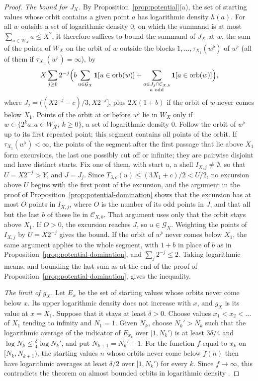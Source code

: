 \documentclass[12pt]{amsart}
\theoremstyle{definition}
\theoremstyle{remark}
\begin{document}
\begin{proof}
\emph{The bound for $J_X$.} By Proposition~\ref{prop:potential}(a), the set of starting values whose orbit contains a given point $a$ has logarithmic density $h(a)$. For all $w$ outside a set of logarithmic density $0$, on which the summand is at most $\sum_{a\in W_X}a\le X^2$, it therefore suffices to bound the summand of $J_X$ at $w$, the sum of the points of $W_X$ on the orbit of $w$ outside the blocks $1,\dots,\tau_{X_1}(w^\flat)$ of $w^\flat$ (all of them if $\tau_{X_1}(w^\flat)=\infty$), by
\[
 X\sum_{j\ge0}2^{-j}\Bigl(b\sum_{u\in\mathcal G_X}\mathbf 1[u\in\operatorname{orb}(w)]+\sum_{\substack{a\in J_j\cap\mathcal C_{X,b}\\ a\text{ odd}}}\mathbf 1[a\in\operatorname{orb}(w)]\Bigr),
\]
where $J_j=((X2^{-j}-c)/3,X2^{-j}]$, plus $2X(1+b)$ if the orbit of $w$ never comes below $X_1$. Points of the orbit at or before $w^\flat$ lie in $W_X$ only if $w\in\{2^ka:a\in W_X,\ k\ge0\}$, a set of logarithmic density $0$. Follow the orbit of $w^\flat$ up to its first repeated point; this segment contains all points of the orbit. If $\tau_{X_1}(w^\flat)<\infty$, the points of the segment after the first passage that lie above $X_1$ form excursions, the last one possibly cut off or infinite; they are pairwise disjoint and have distinct starts. Fix one of them, with start $u$, a shell $I_{X,j}\ne\emptyset$, so that $U=X2^{-j}>Y$, and $J=J_j$. Since $T_{3,c}(u)\le(3X_1+c)/2<U/2$, no excursion above $U$ begins with the first point of the excursion, and the argument in the proof of Proposition~\ref{prop:potential-domination} shows that the excursion has at most $O$ points in $I_{X,j}$, where $O$ is the number of its odd points in $J$, and that all but the last $b$ of these lie in $\mathcal C_{X,b}$. That argument uses only that the orbit stays above $X_1$. If $O>0$, the excursion reaches $J$, so $u\in\mathcal G_X$. Weighting the points of $I_{X,j}$ by $U=X2^{-j}$ gives the bound. If the orbit of $w^\flat$ never comes below $X_1$, the same argument applies to the whole segment, with $1+b$ in place of $b$ as in Proposition~\ref{prop:potential-domination}, and $\sum_j2^{-j}\le2$. Taking logarithmic means, and bounding the last sum as at the end of the proof of Proposition~\ref{prop:potential-domination}, gives the inequality.

\emph{The limit of $g_X$.} Let $E_x$ be the set of starting values whose orbits never come below $x$. Its upper logarithmic density does not increase with $x$, and $g_X$ is its value at $x=X_1$. Suppose that it stays at least $\delta>0$. Choose values $x_1<x_2<\dots$ of $X_1$ tending to infinity and $N_1=1$. Given $N_k$, choose $N_k'>N_k$ such that the logarithmic average of the indicator of $E_{x_k}$ over $[1,N_k')$ is at least $3\delta/4$ and $\log N_k\le\frac\delta4\log N_k'$, and put $N_{k+1}=N_k'+1$. For the function $f$ equal to $x_k$ on $[N_k,N_{k+1})$, the starting values $n$ whose orbits never come below $f(n)$ then have logarithmic averages at least $\delta/2$ over $[1,N_k')$ for every $k$. Since $f\to\infty$, this contradicts the theorem on almost bounded orbits in logarithmic density \cite{Tao_2022,GGM_2025}.


\end{proof}
\end{document}

